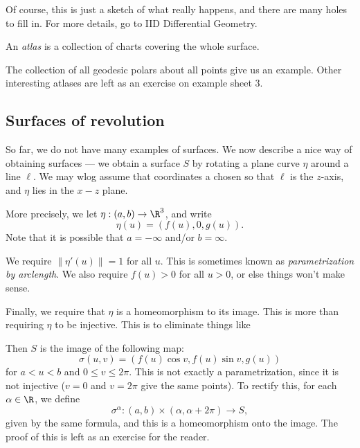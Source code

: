 \documentclass[a4paper]{article}
\begin{document}
Of course, this is just a sketch of what really happens, and there are many holes to fill in. For more details, go to IID Differential Geometry.

\begin{defi}[Atlas]
  An \emph{atlas} is a collection of charts covering the whole surface.
\end{defi}

The collection of all geodesic polars about all points give us an example. Other interesting atlases are left as an exercise on example sheet 3.

\subsection{Surfaces of revolution}
So far, we do not have many examples of surfaces. We now describe a nice way of obtaining surfaces --- we obtain a surface $S$ by rotating a plane curve $\eta$ around a line $\ell$. We may wlog assume that coordinates a chosen so that $\ell$ is the $z$-axis, and $\eta$ lies in the $x-z$ plane.

More precisely, we let $\eta: (a, b) \to \R^3$, and write
\[
  \eta(u) = (f(u), 0, g(u)).
\]
Note that it is possible that $a = -\infty$ and/or $b = \infty$.

We require $\|\eta'(u)\| = 1$ for all $u$. This is sometimes known as \emph{parametrization by arclength}. We also require $f(u) > 0$ for all $u > 0$, or else things won't make sense.

Finally, we require that $\eta$ is a homeomorphism to its image. This is more than requiring $\eta$ to be injective. This is to eliminate things like
\begin{center}
\end{center} %
Then $S$ is the image of the following map:
\[
  \sigma(u, v) = (f(u) \cos v, f(u) \sin v, g(u))
\]
for $a < u < b$ and $0 \leq v \leq 2\pi$. This is not exactly a parametrization, since it is not injective ($v = 0$ and $v = 2\pi$ give the same points). To rectify this, for each $\alpha \in \R$, we define
\[
  \sigma^\alpha: (a, b) \times (\alpha, \alpha + 2\pi) \to S,
\]
given by the same formula, and this is a homeomorphism onto the image. The proof of this is left as an exercise for the reader. %
\end{document}
